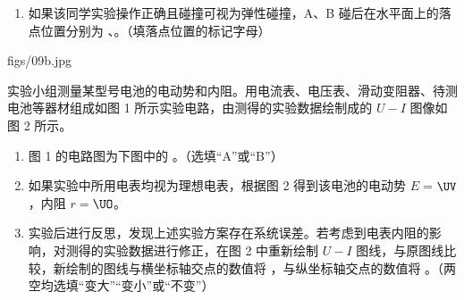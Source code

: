 \documentclass[\gkver]{gaokaozhenti}
\begin{document}
\begin{enumerate}
\begin{enumerate}
	A．斜槽的末端必须是水平的

	B．斜槽的轨道必须是光滑的

	C．必须测出斜槽末端的高度

	D．A、B 的质量必须相同
	\item
	如果该同学实验操作正确且碰撞可视为弹性碰撞，A、B 碰后在水平面上的落点位置分别为 、。（填落点位置的标记字母）
\end{enumerate}
{figs/09b.jpg}

实验小组测量某型号电池的电动势和内阻。用电流表、电压表、滑动变阻器、待测电池等器材组成如图 1 所示实验电路，由测得的实验数据绘制成的 $U - I$ 图像如图 2 所示。

\begin{enumerate}[resume]
	\item
	图 1 的电路图为下图中的 。（选填“A”或“B”）
	\item
	如果实验中所用电表均视为理想电表，根据图 2 得到该电池的电动势 $E = $$\UV$，内阻 $r = $$\UO$。
	\item
	实验后进行反思，发现上述实验方案存在系统误差。若考虑到电表内阻的影响，对测得的实验数据进行修正，在图 2 中重新绘制 $U - I$ 图线，与原图线比较，新绘制的图线与横坐标轴交点的数值将 ，与纵坐标轴交点的数值将 。（两空均选填“变大”“变小”或“不变”）
\end{enumerate}
\end{enumerate}
\end{document}

